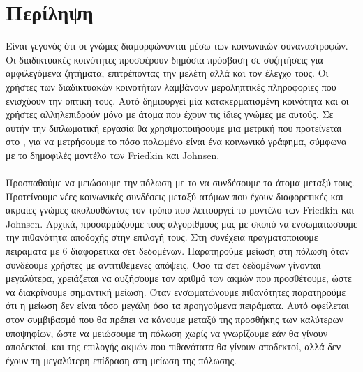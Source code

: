 \chapter*{Περίληψη}

Είναι γεγονός ότι οι γνώμες διαμορφώνονται μέσω των κοινωνικών συναναστροφών. Οι διαδικτυακές κοινότητες προσφέρουν δημόσια πρόσβαση σε συζητήσεις για αμφιλεγόμενα ζητήματα, επιτρέποντας την μελέτη αλλά και τον έλεγχο τους. Οι χρήστες των διαδικτυακών κοινοτήτων λαμβάνουν μεροληπτικές πληροφορίες που ενισχύουν την οπτική τους. Αυτό δημιουργεί μία κατακερματισμένη κοινότητα και οι χρήστες αλληλεπιδρούν μόνο με άτομα που έχουν τις ίδιες γνώμες με αυτούς. Σε αυτήν την διπλωματική εργασία θα χρησιμοποιήσουμε μια μετρική που προτείνεται στο \cite{tsapMatakosTerzi}, για να μετρήσουμε το πόσο πολωμένο είναι ένα κοινωνικό γράφημα, σύμφωνα με το δημοφιλές μοντέλο των Friedkin και Johnsen.
\\
\\
Προσπαθούμε να μειώσουμε την πόλωση με το να συνδέσουμε τα άτομα μεταξύ τους. Προτείνουμε νέες κοινωνικές συνδέσεις μεταξύ ατόμων που έχουν διαφορετικές και ακραίες γνώμες ακολουθώντας τον τρόπο που λειτουργεί το μοντέλο των Friedkin και Johnsen. Αρχικά, προσαρμόζουμε τους αλγορίθμους μας με σκοπό να ενσωματωσουμε την πιθανότητα αποδοχής στην επιλογή τους. Στη συνέχεια πραγματοποιουμε πειραματα με 6 διαφορετικα σετ δεδομένων. Παρατηρούμε μείωση στη πόλωση όταν συνδέουμε χρήστες με αντιτιθέμενες απόψεις. Όσο τα σετ δεδομένων γίνονται μεγαλύτερα, χρειάζεται να αυξήσουμε τον αριθμό των ακμών που προσθέτουμε, ώστε να διακρίνουμε σημαντική μείωση. Όταν ενσωματώνουμε πιθανότητες παρατηρούμε ότι η μείωση δεν είναι τόσο μεγάλη όσο τα προηγούμενα πειράματα. Αυτό οφείλεται στον συμβιβασμό που θα πρέπει να κάνουμε μεταξύ της προσθήκης των καλύτερων υποψηφίων, ώστε να μειώσουμε τη πόλωση χωρίς να γνωρίζουμε εάν θα γίνουν αποδεκτοί, και της επιλογής ακμών που πιθανότατα θα γίνουν αποδεκτοί, αλλά δεν έχουν τη μεγαλύτερη επίδραση στη μείωση της πόλωσης.

\bigskip
